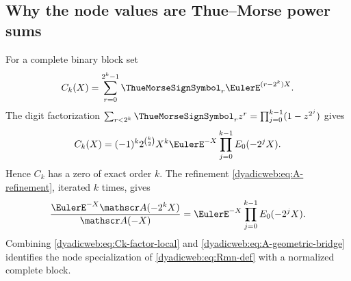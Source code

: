 \documentclass[11pt,oneside]{article}
\theoremstyle{definition}
\theoremstyle{remark}
\begin{document}
\subsection{Why the node values are Thue--Morse power sums}

For a complete binary block set
\begin{equation}
 C_k(X)=\sum_{r=0}^{2^k-1}\ThueMorseSignSymbol_r\EulerE^{(r-2^k)X}.              \label{dyadicweb:eq:Ck-local}
\end{equation}
The digit factorization
\(
 \sum_{r<2^k}\ThueMorseSignSymbol_rz^r=\prod_{j=0}^{k-1}(1-z^{2^j})
\)
gives
\begin{equation}
 C_k(X)=(-1)^k2^{\binom k2}X^k
 \EulerE^{-X}\prod_{j=0}^{k-1}E_0(-2^jX).                     \label{dyadicweb:eq:Ck-factor-local}
\end{equation}
Hence $C_k$ has a zero of exact order $k$.  The refinement
\eqref{dyadicweb:eq:A-refinement}, iterated $k$ times, gives
\begin{equation}
 \frac{\EulerE^{-X}\mathscr A(-2^kX)}{\mathscr A(-X)}
 =\EulerE^{-X}\prod_{j=0}^{k-1}E_0(-2^jX).                    \label{dyadicweb:eq:A-geometric-bridge}
\end{equation}
Combining \eqref{dyadicweb:eq:Ck-factor-local} and \eqref{dyadicweb:eq:A-geometric-bridge} identifies the node
specialization of \eqref{dyadicweb:eq:Rmn-def} with a normalized complete block.
\end{document}
